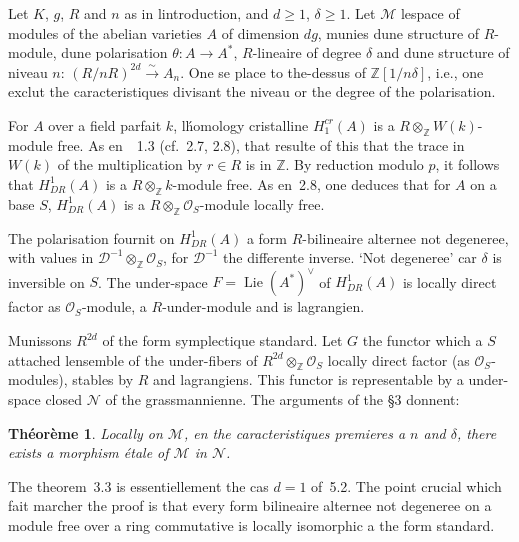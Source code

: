 \documentclass[11pt,a4paper]{article}
\theoremstyle{plain}
\newtheorem{theorem}{Th\'eor\`eme}
\theoremstyle{definition}
\DeclareMathOperator{\Lie}{Lie}
\begin{document}
Let $K$, $g$, $R$ and $n$ as in lintroduction, and $d \geq 1$, $\delta \geq 1$. Let $\mathscr{M}$
lespace of modules of the abelian varieties $A$ of dimension $dg$, munies dune
structure of $R$-module, dune polarisation $\theta: A \to A^*$, $R$-lineaire of degree $\delta$ and
dune structure of niveau $n$: $(R/nR)^{2d} \xrightarrow{\sim} A_n$. One se place to the-dessus of $\mathbb{Z}[1/n\delta]$,
i.e., one exclut the caracteristiques divisant the niveau or the degree of the polarisation.

For $A$ over a field parfait $k$, l\'homology cristalline $H^{cr}_1(A)$ is a
$R \otimes_\mathbb{Z} W(k)$-module free. As en~\cite{Rapoport}~1.3 (cf.~2.7, 2.8), that resulte of this that
the trace in $W(k)$ of the multiplication by $r \in R$ is in $\mathbb{Z}$. By reduction
modulo $p$, it follows that $H^1_{DR}(A)$ is a $R \otimes_\mathbb{Z} k$-module free. As en~2.8,
one deduces that for $A$ on a base $S$, $H^1_{DR}(A)$ is a $R \otimes_\mathbb{Z} \mathscr{O}_S$-module
locally free.

The polarisation fournit on $H^1_{DR}(A)$ a form $R$-bilineaire alternee not
degeneree, with values in $\mathscr{D}^{-1} \otimes_\mathbb{Z} \mathscr{O}_S$, for $\mathscr{D}^{-1}$ the differente inverse. `Not
degeneree' car $\delta$ is inversible on $S$. The under-space $F = \Lie(A^*)^\vee$ of $H^1_{DR}(A)$
is locally direct factor
as $\mathscr{O}_S$-module, a $R$-under-module and is lagrangien.

Munissons $R^{2d}$ of the form symplectique standard. Let $G$ the functor which a
$S$ attached lensemble of the under-fibers of $R^{2d} \otimes_\mathbb{Z} \mathscr{O}_S$ locally direct factor
(as $\mathscr{O}_S$-modules), stables by $R$ and lagrangiens. This functor is representable
by a under-space closed $\mathscr{N}$ of the grassmannienne. The arguments of the \S3
donnent:

\begin{theorem}
Locally on $\mathscr{M}$, en the caracteristiques premieres a $n$ and $\delta$,
there exists a morphism étale of $\mathscr{M}$ in $\mathscr{N}$.
\end{theorem}

The theorem~3.3 is essentiellement the cas $d=1$ of~5.2. The point crucial which
fait marcher the proof is that every form bilineaire alternee not degeneree on
a module free over a ring commutative is locally isomorphic a the
form standard.

\subsection{}
\end{document}
